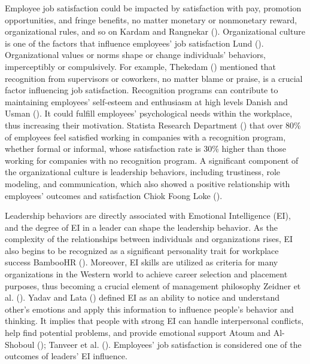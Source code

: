 \documentclass[
  man,
  longtable,
  nolmodern,
  notxfonts,
  notimes,
  colorlinks=true,linkcolor=blue,citecolor=blue,urlcolor=blue]{apa7}
\begin{document}
Employee job satisfaction could be impacted by satisfaction with pay,
promotion opportunities, and fringe benefits, no matter monetary or
nonmonetary reward, organizational rules, and so on Kardam and Rangnekar
(). Organizational culture is one of the
factors that influence employees' job satisfaction Lund
(). Organizational values or norms shape or
change individuals' behaviors, imperceptibly or compulsively. For
example, Thekedam () mentioned that
recognition from supervisors or coworkers, no matter blame or praise, is
a crucial factor influencing job satisfaction. Recognition programs can
contribute to maintaining employees' self-esteem and enthusiasm at high
levels Danish and Usman (). It could
fulfill employees' psychological needs within the workplace, thus
increasing their motivation. Statista Research Department
() that
over 80\% of employees feel satisfied working in companies with a
recognition program, whether formal or informal, whose satisfaction rate
is 30\% higher than those working for companies with no recognition
program. A significant component of the organizational culture is
leadership behaviors, including trustiness, role modeling, and
communication, which also showed a positive relationship with employees'
outcomes and satisfaction Chiok Foong Loke
().

Leadership behaviors are directly associated with Emotional Intelligence
(EI), and the degree of EI in a leader can shape the leadership
behavior. As the complexity of the relationships between individuals and
organizations rises, EI also begins to be recognized as a significant
personality trait for workplace success BambooHR
(). Moreover, EI skills are utilized as
criteria for many organizations in the Western world to achieve career
selection and placement purposes, thus becoming a crucial element of
management philosophy Zeidner et al. ().
Yadav and Lata () defined EI as an ability
to notice and understand other's emotions and apply this information to
influence people's behavior and thinking. It implies that people with
strong EI can handle interpersonal conflicts, help find potential
problems, and provide emotional support Atoum and Al-Shoboul
(); Tanveer et al.
(). Employees' job satisfaction is
considered one of the outcomes of leaders' EI influence.
\end{document}
